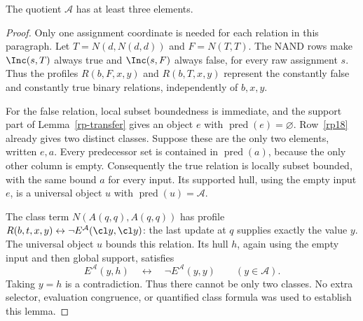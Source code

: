 \begin{lemma}\label{rp-three}
The quotient $\mathcal A$ has at least three elements.
\end{lemma}
\begin{proof}
Only one assignment coordinate is needed for each relation in this
paragraph. Let $T=N(d,N(d,d))$ and $F=N(T,T)$. The NAND rows make
$\Inc(s,T)$ always true and $\Inc(s,F)$ always false, for every raw
assignment $s$. Thus the profiles $R(b,F,x,y)$ and $R(b,T,x,y)$
represent the constantly false and constantly true binary relations,
independently of $b,x,y$.

For the false relation, local subset boundedness is immediate, and the
support part of Lemma~\ref{rp-transfer} gives an object $e$ with
$\operatorname{pred}(e)=\varnothing$. Row~\ref{rp18} already gives
two distinct classes. Suppose these are the only two elements, written
$e,a$. Every predecessor set is contained in
$\operatorname{pred}(a)$, because the only other column is empty.
Consequently the true relation is locally subset bounded, with the
same bound $a$ for every input. Its supported hull, using the empty
input $e$, is a universal object $u$ with
$\operatorname{pred}(u)=\mathcal A$.

The class term $N(A(q,q),A(q,q))$ has profile
$R(b,t,x,y)\leftrightarrow\neg E^{\mathcal A}(\cl y,\cl y)$:
the last update at $q$ supplies exactly the value $y$. The universal
object $u$ bounds this relation. Its hull $h$, again using the empty
input and then global support, satisfies
\[
 E^{\mathcal A}(y,h)\quad\longleftrightarrow\quad
 \neg E^{\mathcal A}(y,y)
 \qquad(y\in\mathcal A).
\]
Taking $y=h$ is a contradiction. Thus there cannot be only two classes.
No extra selector, evaluation congruence, or quantified class formula
was used to establish this lemma.
\end{proof}

